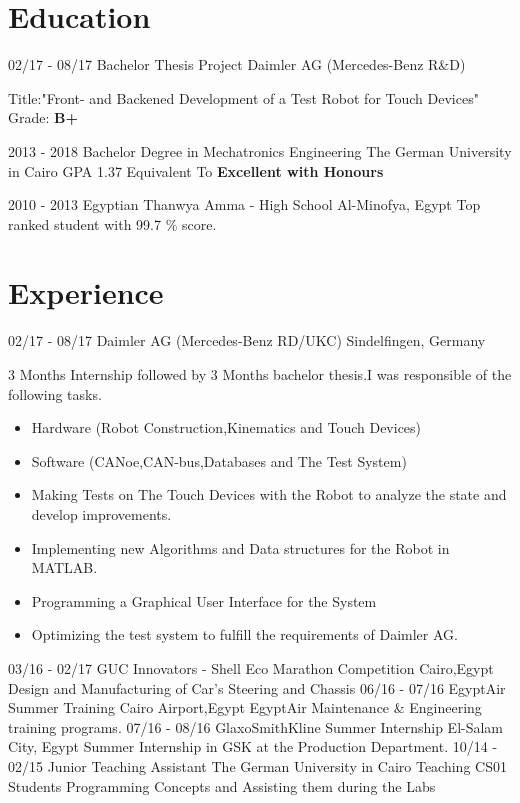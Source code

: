 \documentclass[]{friggeri-cv}
\begin{document}
\section{Education}
\begin{entrylist}
 \entry
    {02/17 - 08/17}
    {Bachelor Thesis Project}
    {Daimler AG (Mercedes-Benz R\&D)}
    {Title:"Front- and Backened Development of a Test Robot for Touch Devices"\\
    Grade: \textbf{B+} 
    
    }
  \entry
    {2013 - 2018}
    {Bachelor Degree in Mechatronics Engineering}
    {The German University in Cairo}
    {GPA 1.37 Equivalent To \textbf{Excellent with Honours}\\
   }
    
     \entry
    {2010 - 2013}
    {Egyptian Thanwya Amma - High School}
    {Al-Minofya, Egypt}
    {Top ranked student with 99.7 \% score.\\
    }
  \end{entrylist}
\section{Experience}
\begin{entrylist}
  \entry
    {02/17 - 08/17}
    {Daimler AG (Mercedes-Benz RD/UKC)}
    {Sindelfingen, Germany}
    {3 Months Internship followed by 3 Months bachelor thesis.I was responsible of the following tasks.
    \begin{itemize}
        \item Hardware (Robot Construction,Kinematics and Touch Devices)
        \item Software (CANoe,CAN-bus,Databases and The Test System)
        
        \item Making Tests on The Touch Devices with the Robot to analyze the state and develop improvements.
        \item Implementing new Algorithms and Data structures for the Robot in MATLAB.
        \item Programming a Graphical User Interface for the System
        \item Optimizing the test system to fulfill the requirements of Daimler AG.
    \end{itemize}}
  \entry
    {03/16 - 02/17}
    {GUC Innovators - Shell Eco Marathon Competition}
    {Cairo,Egypt}
    {Design and Manufacturing of Car's Steering and Chassis }
    \entry
    {06/16 - 07/16}
    {EgyptAir Summer Training}
    {Cairo Airport,Egypt}
    {EgyptAir Maintenance \& Engineering training programs.}
    \entry
    {07/16 - 08/16}
    {GlaxoSmithKline Summer Internship}
    {El-Salam City, Egypt}
    {Summer Internship in GSK at the Production Department.}
    \entry
    {10/14 - 02/15}
    {Junior Teaching Assistant}
    {The German University in Cairo}
    {Teaching CS01 Students Programming Concepts and Assisting them during the Labs}
\end{entrylist}
\end{document}
